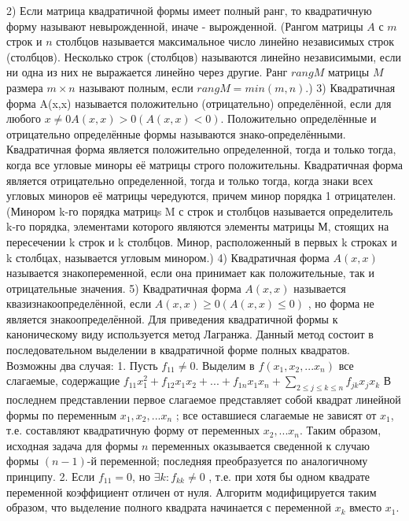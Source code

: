 \documentclass[a4paper,14pt]{report}
\newcommand\tab[1][1cm]{\hspace*{#1}}
\newcommand{\dsum}[2]{\sum\limits_{#1}{#2}}
\newcommand{\tl}{\newline\tab}
\begin{document}
\tl
2) Если матрица квадратичной формы имеет полный ранг, то квадратичную форму называют невырожденной, иначе - вырожденной.
\tl
(Рангом матрицы $A$ с $m$ строк и $n$ столбцов называется максимальное число линейно независимых строк (столбцов). Несколько строк (столбцов) называются линейно независимыми, если ни одна из них не выражается линейно через другие. Ранг $rangM$ матрицы $M$ размера $m \times n$ называют полным, если $rangM = min(m,n)$.)
\tl
3) Квадратичная форма A(x,x) называется положительно (отрицательно) определённой, если для любого $x \ne 0 A(x,x) > 0 (A(x,x) < 0)$. Положительно определённые и отрицательно определённые формы называются знако-определёнными. 
\tl
Квадратичная форма является положительно определенной, тогда и только тогда, когда все угловые миноры её матрицы строго положительны.
\tl
Квадратичная форма является отрицательно определенной, тогда и только тогда, когда знаки всех угловых миноров её матрицы чередуются, причем минор порядка 1 отрицателен.
\tl
(Минором k-го порядка матрицs M с  строк и  столбцов называется определитель k-го порядка, элементами которого являются элементы матрицы М, стоящих на пересечении k строк и k столбцов. 
Минор, расположенный в первых k строках и k столбцах, называется угловым минором.)
\tl
4) Квадратичная форма $A(x,x)$ называется знакопеременной, если она принимает как положительные, так и отрицательные значения.
\tl
5) Квадратичная форма $A(x,x)$ называется квазизнакоопределённой, если  $A(x,x) \ge 0 (A(x,x) \le 0)$ , но форма не является знакоопределённой.
\tl
Для приведения квадратичной формы к каноническому виду используется метод Лагранжа. Данный метод состоит в последовательном выделении в квадратичной форме полных квадратов. Возможны два случая:
\tl
1. Пусть $f_{11} \ne 0$. Выделим в $f(x_1,x_2,...x_n)$ все слагаемые, содержащие 
$f_{11}x_{1}^{2}+f_{12}x_{1}x_{2}+...+f_{1n}x_{1}x_{n}+\dsum{2 \le j \le k \le n}{f_{jk}x_{j}x_{k}}$
\tl
В последнем представлении первое слагаемое представляет собой квадрат линейной формы по переменным $x_1,x_2,...x_n$ ; все оставшиеся слагаемые не зависят от $x_1$, т.е. составляют квадратичную форму от переменных $x_2,...x_n$. Таким образом, исходная задача для формы $n$ переменных оказывается сведенной к случаю формы $(n-1)$-й переменной; последняя преобразуется по аналогичному принципу.
\tl
2. Если $f_{11}=0$, но $\exists k: f_{kk} \ne 0$ , т.е. при хотя бы одном квадрате переменной коэффициент отличен от нуля. Алгоритм модифицируется таким образом, что выделение полного квадрата начинается с переменной $x_{k}$ вместо $x_{1}$.
\end{document}
